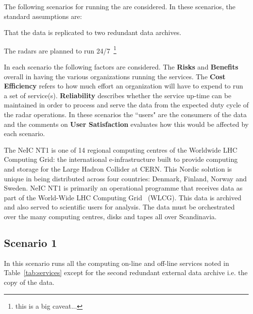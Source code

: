 \documentclass[12pt,a4paper]{article}
\newcommand{\nnt}{NeIC NT1\xspace}
\begin{document}
The following scenarios for running the \ED \einfra are considered.
In these scenarios, the standard assumptions are:
\bitm
\item That the \ED data is replicated to two redundant data archives.
\item The \ED radars are planned to run 24/7~\footnote{this is a big caveat...}
\eitm

In each scenario the following factors are considered.
The {\bf Risks} and {\bf Benefits} overall in having the various organizations running the services.
The {\bf Cost Efficiency} refers to how much effort an organization will have to expend to run a set of service(s).
{\bf Reliability} describes whether the service up-time can be maintained in order to process and serve the data from the expected duty cycle of the radar operations.
In these scenarios the ``users" are the consumers of the \ED data and the comments on {\bf User Satisfaction} evaluates how this would be affected by each scenario.

The \nnt is one of 14 regional computing centres of the Worldwide LHC Computing Grid:
the international e-infrastructure built to provide computing and storage for the Large Hadron Collider at CERN.
This Nordic solution is unique in being distributed across four countries: Denmark, Finland, Norway and Sweden.
\nnt is primarily an \einfra operational programme that receives data as part of the World-Wide LHC Computing Grid~\cite{wlcg} (WLCG).
This data is archived and also served to scientific users for analysis.
The data must be orchestrated over the many computing centres, disks and tapes all over Scandinavia.


\subsection{Scenario 1}
\label{ssec:scen1}

In this scenario \EC runs all the computing on-line and off-line services noted in Table~\ref{tab:services} except for the second redundant external data archive i.e. the copy of the \ED data.
\end{document}
